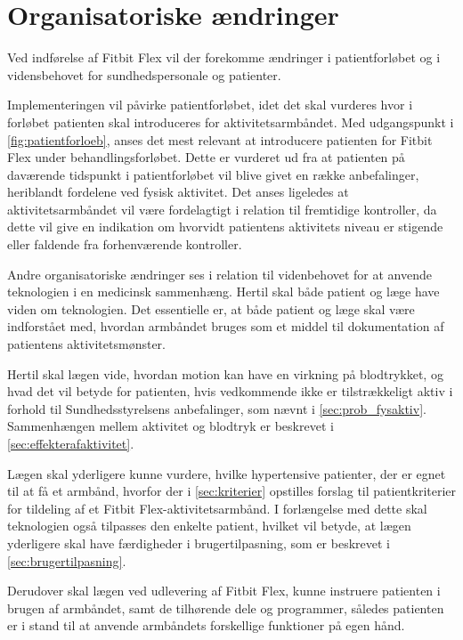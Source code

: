 \section{Organisatoriske ændringer}\label{sec:org_aendringer}
Ved indførelse af Fitbit Flex vil der forekomme ændringer i patientforløbet og i vidensbehovet for sundhedspersonale og patienter. 

Implementeringen vil påvirke patientforløbet, idet det skal vurderes hvor i forløbet patienten skal introduceres for aktivitetsarmbåndet. 
Med udgangspunkt i \autoref{fig:patientforloeb}, anses det mest relevant at introducere patienten for Fitbit Flex under behandlingsforløbet. Dette er vurderet ud fra at patienten på daværende tidspunkt i patientforløbet vil blive givet en række anbefalinger, heriblandt fordelene ved fysisk aktivitet. 
Det anses ligeledes at aktivitetsarmbåndet vil være fordelagtigt i relation til fremtidige kontroller, da dette vil give en indikation om hvorvidt patientens aktivitets niveau er stigende eller faldende fra forhenværende kontroller.   

Andre organisatoriske ændringer ses i relation til videnbehovet for at anvende teknologien i en medicinsk sammenhæng. Hertil skal både patient og læge have viden om teknologien. Det essentielle er, at både patient og læge skal være indforstået med, hvordan armbåndet bruges som et middel til dokumentation af patientens aktivitetsmønster.

Hertil skal lægen vide, hvordan motion kan have en virkning på blodtrykket, og hvad det vil betyde for patienten, hvis vedkommende ikke er tilstrækkeligt aktiv i forhold til Sundhedsstyrelsens anbefalinger, som nævnt i \autoref{sec:prob_fysaktiv}. Sammenhængen mellem aktivitet og blodtryk er beskrevet i \autoref{sec:effekterafaktivitet}.

Lægen skal yderligere kunne vurdere, hvilke hypertensive patienter, der er egnet til at få et armbånd, hvorfor der i \autoref{sec:kriterier} opstilles forslag til patientkriterier for tildeling af et Fitbit Flex-aktivitetsarmbånd. I forlængelse med dette skal teknologien også tilpasses den enkelte patient, hvilket vil betyde, at lægen yderligere skal have færdigheder i brugertilpasning, som er beskrevet i \autoref{sec:brugertilpasning}. 

Derudover skal lægen ved udlevering af Fitbit Flex, kunne instruere patienten i brugen af armbåndet, samt de tilhørende dele og programmer, således patienten er i stand til at anvende armbåndets forskellige funktioner på egen hånd. 

